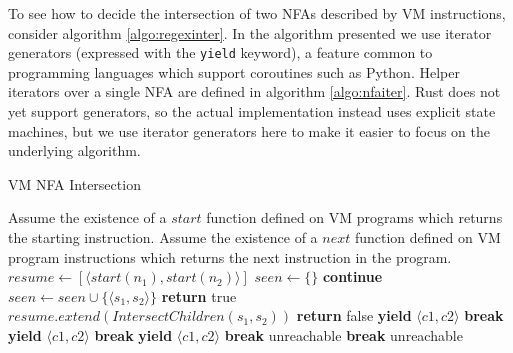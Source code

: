 To see how to decide the intersection of two NFAs described
by VM instructions, consider algorithm \ref{algo:regexinter}.
In the algorithm presented we use iterator generators
(expressed with the \verb'yield' keyword),
a feature common to programming languages which support coroutines
such as Python. Helper iterators over a single NFA are defined
in algorithm \ref{algo:nfaiter}. Rust does not yet support generators, so the
actual implementation instead uses explicit state machines, but
we use iterator generators here to make it easier to focus on the underlying
algorithm.

\begin{algorithm}
\caption{VM NFA Intersection} \label{algo:regexinter}
\begin{algorithmic}
  \State Assume the existence of a $start$ function defined on
          VM programs which returns the starting instruction.
  \State Assume the existence of a $next$ function defined on
          VM program instructions which returns the next instruction
          in the program.
  \State $resume \gets [\langle start(n_1), start(n_2) \rangle]$
  \State $seen \gets \{\}$
      \State \textbf{continue}
    \EndIf
    \State $seen \gets seen \cup \{\langle s_1, s_2 \rangle\}$
      \State \textbf{return} true
    \EndIf
    \State $resume.extend(IntersectChildren(s_1, s_2))$
  \EndWhile
  \State \textbf{return} false
\EndProcedure
{}
          \State \textbf{yield} $\langle c1, c2 \rangle$
          \State \textbf{break}
        \EndCase
              \State \textbf{yield} $\langle c1, c2 \rangle$
              \State \textbf{break}
            \EndCase
              \If{$\alpha_1 \cap \alpha_2 \not= \emptyset$}
                \State \textbf{yield} $\langle c1, c2 \rangle$
              \EndIf
              \State \textbf{break}
            \EndCase
              \State unreachable
            \EndCase
          \EndSwitch
          \State \textbf{break}
        \EndCase
          \State unreachable
        \EndCase
      \EndSwitch
    \EndFor
  \EndFor
\EndProcedure
\end{algorithmic}
\end{algorithm}

